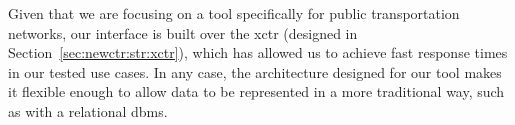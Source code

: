     
    
    
    
    
    
    
    Given that we are focusing on a tool specifically for public transportation networks, our interface is built over the \gls{xctr} (designed in Section~\ref{sec:newctr:str:xctr}), which has allowed us to achieve fast response times in our tested use cases. In any case, the architecture designed for our tool makes it flexible enough to allow data to be represented in a more traditional way, such as with a relational \gls{dbms}.
	
